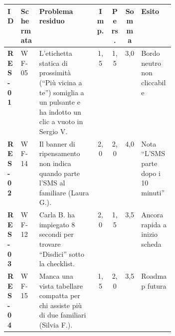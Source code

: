 \begin{center}
\label{tab:d-residual-urgency}
\footnotesize
\setlength{\tabcolsep}{3pt}
\begin{tabularx}{\linewidth}{@{}>{\raggedright\arraybackslash}p{0.08\linewidth} >{\raggedright\arraybackslash}p{0.11\linewidth} >{\raggedright\arraybackslash}X c c c >{\raggedright\arraybackslash}p{0.2\linewidth}@{}}
\toprule
\textbf{ID} & \textbf{Schermata} & \textbf{Problema residuo} & \textbf{Imp.} & \textbf{Pers.} & \textbf{Somma} & \textbf{Esito} \\
\midrule
\hypertarget{req:RES-01}{}\textbf{RES-01} & WF-05 & L'etichetta statica di prossimità (``Più vicina a te'') somiglia a un pulsante e ha indotto un clic a vuoto in Sergio V. & 1,5 & 1,5 & 3,0 & Bordo neutro non cliccabile \\
\addlinespace[2pt]
\hypertarget{req:RES-02}{}\textbf{RES-02} & WF-14 & Il banner di ripensamento non indica quando parte l'SMS al familiare (Laura G.). & 2,0 & 2,0 & 4,0 & Nota ``L'SMS parte dopo i 10 minuti'' \\
\addlinespace[2pt]
\hypertarget{req:RES-03}{}\textbf{RES-03} & WF-12 & Carla B. ha impiegato 8 secondi per trovare ``Disdici'' sotto la checklist. & 2,0 & 1,5 & 3,5 & Ancora rapida a inizio scheda \\
\addlinespace[2pt]
\hypertarget{req:RES-04}{}\textbf{RES-04} & WF-15 & Manca una vista tabellare compatta per chi assiste più di due familiari (Silvia F.). & 1,5 & 2,0 & 3,5 & Roadmap futura \\
\bottomrule
\end{tabularx}
\end{center}

